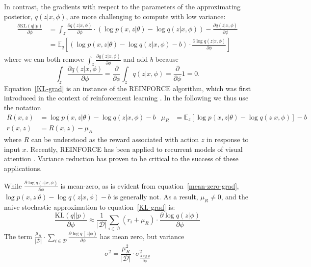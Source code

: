 \documentclass{article} %
\def\KL{\text{KL}}
\begin{document}
In contrast, the gradients with respect to the parameters of the approximating posterior, $q(z | x, \phi)$, are more challenging to compute with low variance:
\begin{align}
\frac{\partial \KL (q || p)}{\partial \phi} &= \int_z \frac{\partial q(z | x, \phi)}{\partial \phi}  \cdot \left( \log p(x,z | \theta) - \log q(z | x, \phi) \right) 
- \frac{\partial q(z | x, \phi)}{\partial \phi} \nonumber \\
&= \mathbb{E}_{q} \left[ \left( \log p(x,z | \theta) - \log q(z | x, \phi) - b \right) \cdot \frac{ \partial \log q(z | x, \phi)}{\partial \phi} \right] \label{KL-grad}
\end{align}
where we can both remove $\int_z \frac{\partial q(z | x, \phi)}{\partial \phi}$ and add $b$ because
\begin{equation} \label{mean-zero-grad}
\int_z \frac{\partial q(z | x, \phi)}{\partial \phi} = \frac{\partial}{\partial \phi} \int_z q(z | x, \phi) = \frac{\partial}{\partial \phi} 1 = 0.
\end{equation}
Equation~\ref{KL-grad} is an instance of the REINFORCE algorithm, which was first introduced in the context of reinforcement learning \cite{williams1992simple, bengio2013estimating}.  In the following we thus use the notation
\begin{align*}
R(x,z) &= \log p(x,z | \theta) - \log q(z | x, \phi) - b & \mu_R &= \mathbb{E}_z \left[ \log p(x,z | \theta) - \log q(z | x, \phi) \right] - b \\
r(x,z) &= R(x,z) - \mu_R
\end{align*}
where $R$ can be understood as the reward associated with action $z$ in response to input $x$.  Recently, REINFORCE has been applied to recurrent models of visual attention \cite{mnih2014recurrent, xu2015show}.  Variance reduction has proven to be critical to the success of these applications.  

While $\frac{\partial \log q(z | x, \phi)}{\partial \phi}$ is mean-zero, as is evident from equation~\ref{mean-zero-grad}, $\log p(x,z|\theta) - \log q(z | x, \phi) -b $ is generally not.  As a result, $\mu_R \not= 0$, and the naive stochastic approximation to equation~\ref{KL-grad} is:
\begin{equation} \label{baseline-stochastic-approximation}
\frac{\KL (q || p)}{\partial \phi} \approx \frac{1}{|\mathcal{D}|} \sum_{i \in \mathcal{D}} \left( r_i + \mu_R \right) \cdot \frac{\partial \log q(z|\phi)}{\partial \phi}
\end{equation}
The term $\frac{\mu_R}{|\mathcal{D}|} \cdot \sum_{i \in \mathcal{D}} \frac{\partial \log q(z|\phi)}{\partial \phi}$ has mean zero, but variance
\begin{equation*}
\sigma^2 = \frac{\mu_R^2}{|\mathcal{D} |} \cdot \sigma_{\frac{\partial \log q}{\partial \phi}}^2
\end{equation*}
\end{document}
